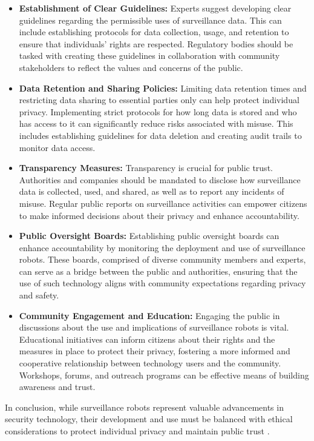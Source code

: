\begin{itemize}
    \item \textbf{Establishment of Clear Guidelines:} Experts suggest developing clear guidelines regarding the permissible uses of surveillance data. This can include establishing protocols for data collection, usage, and retention to ensure that individuals’ rights are respected. Regulatory bodies should be tasked with creating these guidelines in collaboration with community stakeholders to reflect the values and concerns of the public.

    \item \textbf{Data Retention and Sharing Policies:} Limiting data retention times and restricting data sharing to essential parties only can help protect individual privacy. Implementing strict protocols for how long data is stored and who has access to it can significantly reduce risks associated with misuse. This includes establishing guidelines for data deletion and creating audit trails to monitor data access.

    \item \textbf{Transparency Measures:} Transparency is crucial for public trust. Authorities and companies should be mandated to disclose how surveillance data is collected, used, and shared, as well as to report any incidents of misuse. Regular public reports on surveillance activities can empower citizens to make informed decisions about their privacy and enhance accountability.

    \item \textbf{Public Oversight Boards:} Establishing public oversight boards can enhance accountability by monitoring the deployment and use of surveillance robots. These boards, comprised of diverse community members and experts, can serve as a bridge between the public and authorities, ensuring that the use of such technology aligns with community expectations regarding privacy and safety.

    \item \textbf{Community Engagement and Education:} Engaging the public in discussions about the use and implications of surveillance robots is vital. Educational initiatives can inform citizens about their rights and the measures in place to protect their privacy, fostering a more informed and cooperative relationship between technology users and the community. Workshops, forums, and outreach programs can be effective means of building awareness and trust.
\end{itemize}

In conclusion, while surveillance robots represent valuable advancements in security technology, their development and use must be balanced with ethical considerations to protect individual privacy and maintain public trust \cite{brookings}.
